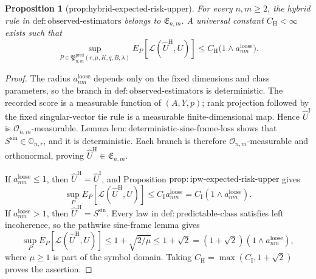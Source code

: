 \documentclass{article}
\newtheorem{proposition}{Proposition}
\begin{document}
\begin{proposition}[prop:hybrid-expected-risk-upper]\label{prop:hybrid-expected-risk-upper}
For every \(n,m\ge2\), the hybrid rule in \(\mathrm{def:observed\mbox{-}estimators}\) belongs to \(\mathfrak E_{n,m}\).  A universal constant \(C_{\mathrm H}<\infty\) exists such that
\[
 \sup_{P\in\mathfrak P^{\mathrm{pred}}_{n,m}(r,\mu,K,q,B,\lambda)}
 E_P[\mathcal L(\widehat U^{\mathrm H},U)]
 \le C_{\mathrm H}\bigl(1\wedge a^{\mathrm{loose}}_{nm}\bigr).
\]
\end{proposition}
\begin{proof}
The radius \(a^{\mathrm{loose}}_{nm}\) depends only on the fixed dimensions and class parameters, so the branch in \(\mathrm{def:observed\mbox{-}estimators}\) is deterministic.  The recorded score is a measurable function of \((A,Y,p)\); rank projection followed by the fixed singular-vector tie rule is a measurable finite-dimensional map.  Hence \(\widehat U^{\mathrm I}\) is \(\mathcal O_{n,m}\)-measurable.  Lemma \(\mathrm{lem:deterministic\mbox{-}sine\mbox{-}frame\mbox{-}loss}\) shows that \(S^{\mathrm{sin}}\in\mathbb O_{n,r}\), and it is deterministic.  Each branch is therefore \(\mathcal O_{n,m}\)-measurable and orthonormal, proving \(\widehat U^{\mathrm H}\in\mathfrak E_{n,m}\).

If \(a^{\mathrm{loose}}_{nm}\le1\), then \(\widehat U^{\mathrm H}=\widehat U^{\mathrm I}\), and Proposition \(\mathrm{prop:ipw\mbox{-}expected\mbox{-}risk\mbox{-}upper}\) gives
\[
 \sup_PE_P[\mathcal L(\widehat U^{\mathrm H},U)]
 \le C_{\mathrm I}a^{\mathrm{loose}}_{nm}
 =C_{\mathrm I}(1\wedge a^{\mathrm{loose}}_{nm}).
\]
If \(a^{\mathrm{loose}}_{nm}>1\), then \(\widehat U^{\mathrm H}=S^{\mathrm{sin}}\).  Every law in \(\mathrm{def:predictable\mbox{-}class}\) satisfies left incoherence, so the pathwise sine-frame lemma gives
\[
 \sup_PE_P[\mathcal L(\widehat U^{\mathrm H},U)]
 \le1+\sqrt{2/\mu}
 \le1+\sqrt2
 =(1+\sqrt2)(1\wedge a^{\mathrm{loose}}_{nm}),
\]
where \(\mu\ge1\) is part of the symbol domain.  Taking \(C_{\mathrm H}=\max(C_{\mathrm I},1+\sqrt2)\) proves the assertion.
\end{proof}
\end{document}

